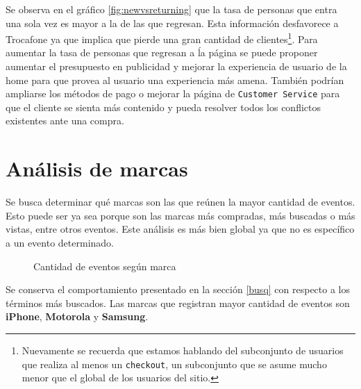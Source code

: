 \documentclass[a4paper]{article}
\begin{document}
Se observa en el gráfico \ref{fig:newvsreturning} que la tasa de personas que entra una sola vez es mayor a la de las que regresan. Esta información desfavorece a Trocafone ya que implica que pierde una gran cantidad de clientes\footnote{Nuevamente se recuerda que estamos hablando del subconjunto de usuarios que realiza al menos un \texttt{checkout}, un subconjunto que se asume mucho menor que el global de los usuarios del sitio.}. Para aumentar la tasa de personas que regresan a ĺa página se puede proponer aumentar el presupuesto en publicidad y mejorar la experiencia de usuario de la home para que provea al usuario una experiencia más amena. También podrían ampliarse los métodos de pago o mejorar la página de \texttt{Customer Service} para que el cliente se sienta más contenido y pueda resolver todos los conflictos existentes ante una compra.

\section{Análisis de marcas}

Se busca determinar qué marcas son las que reúnen la mayor cantidad de eventos. Esto puede ser ya sea porque son las marcas más compradas, más buscadas o más vistas, entre otros eventos. Este análisis es más bien global ya que no es específico a un evento determinado.

\begin{figure}[h!]
	\caption{Cantidad de eventos según marca}
	\label{fig:freqbrands}
\end{figure}

Se conserva el comportamiento presentado en la sección \ref{busq} con respecto a los términos más buscados. Las marcas que registran mayor cantidad de eventos son \textbf{iPhone}, \textbf{Motorola} y \textbf{Samsung}.
\end{document}
